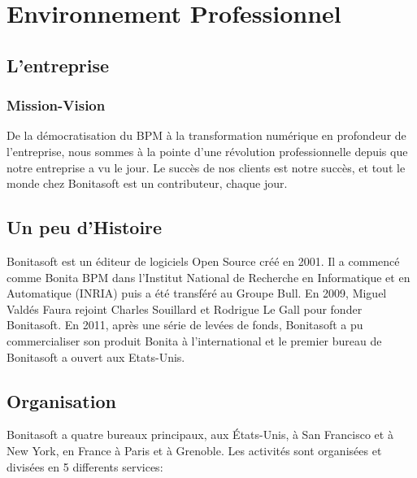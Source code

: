 \section{Environnement Professionnel}
\subsection{L'entreprise}
\subsubsection{Mission-Vision}
De la démocratisation du BPM à la transformation numérique en profondeur de l'entreprise, nous sommes à la pointe d'une révolution professionnelle depuis que notre entreprise a vu le jour.
Le succès de nos clients est notre succès, et tout le monde chez Bonitasoft est un contributeur, chaque jour.
\cite{Bonitasoft2017BONITA}

\subsection{Un peu d'Histoire}
Bonitasoft est un éditeur de logiciels Open Source créé en 2001. Il a commencé comme Bonita BPM dans l'Institut National de Recherche en Informatique et en Automatique (INRIA) puis a été transféré au Groupe Bull.
En 2009, Miguel Valdés Faura rejoint Charles Souillard et Rodrigue Le Gall pour fonder Bonitasoft.
En 2011, après une série de levées de fonds, Bonitasoft a pu commercialiser son produit Bonita à l'international et le premier bureau de Bonitasoft a ouvert aux Etats-Unis.\cite{wikipedia_2018}

\subsection{Organisation}
Bonitasoft a quatre bureaux principaux, aux États-Unis, à San Francisco et à New York, en France à Paris et à Grenoble.
Les activités sont organisées et divisées en 5 differents services:

\begin{center}
\end{center}








